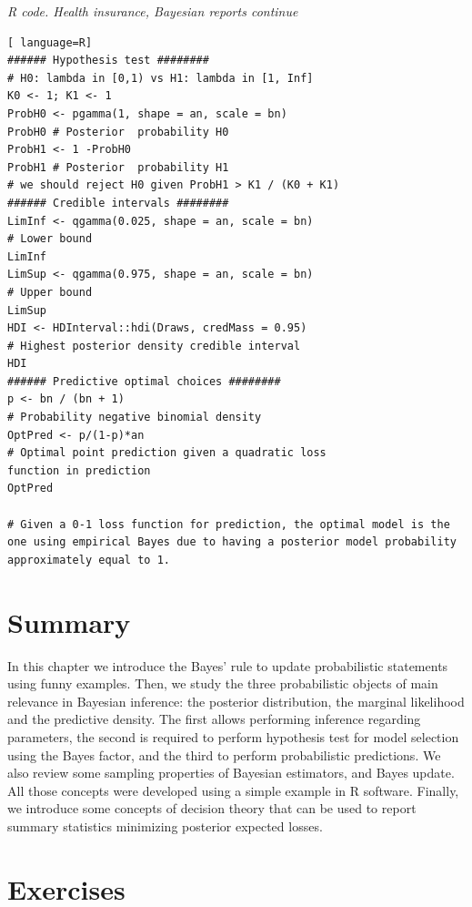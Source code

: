 \begin{tcolorbox}[enhanced,width=4.67in,center upper,
	fontupper=\large\bfseries,drop shadow southwest,sharp corners]
	\textit{R code. Health insurance, Bayesian reports continue}
\begin{VF}
\begin{lstlisting}[ language=R]
###### Hypothesis test ########
# H0: lambda in [0,1) vs H1: lambda in [1, Inf]
K0 <- 1; K1 <- 1
ProbH0 <- pgamma(1, shape = an, scale = bn) 
ProbH0 # Posterior  probability H0
ProbH1 <- 1 -ProbH0
ProbH1 # Posterior  probability H1
# we should reject H0 given ProbH1 > K1 / (K0 + K1) 
###### Credible intervals ########
LimInf <- qgamma(0.025, shape = an, scale = bn) 
# Lower bound
LimInf
LimSup <- qgamma(0.975, shape = an, scale = bn) 
# Upper bound
LimSup
HDI <- HDInterval::hdi(Draws, credMass = 0.95) 
# Highest posterior density credible interval
HDI
###### Predictive optimal choices ########
p <- bn / (bn + 1) 
# Probability negative binomial density
OptPred <- p/(1-p)*an 
# Optimal point prediction given a quadratic loss 
function in prediction
OptPred

# Given a 0-1 loss function for prediction, the optimal model is the one using empirical Bayes due to having a posterior model probability approximately equal to 1.
\end{lstlisting}
\end{VF}
\end{tcolorbox}


\section{Summary}
In this chapter we introduce the Bayes' rule to update probabilistic statements using funny examples. Then, we study  the three probabilistic objects of main relevance in Bayesian inference: the posterior distribution, the marginal likelihood and the predictive density. The first allows performing inference regarding parameters, the second is required to perform hypothesis test for model selection using the Bayes factor, and the third to perform probabilistic predictions. We also review some sampling properties of Bayesian estimators, and Bayes update. All those concepts were developed using a simple example in R software. Finally, we introduce some concepts of decision theory that can be used to report summary statistics minimizing posterior expected losses.
 
\section{Exercises}

